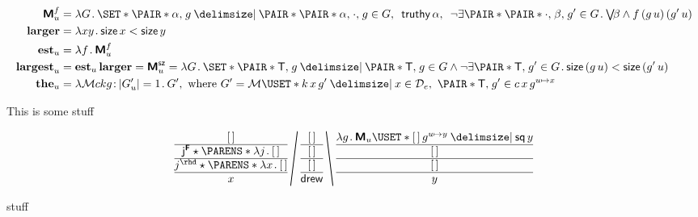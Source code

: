 \documentclass[10pt,fleqn]{article}
\newcommand{\M}{\text{\sffamily\bfseries M}}
\newcommand{\F}{\text{\sffamily\bfseries F}}
\begin{document}
\begin{minipage}[t]{0.6\textwidth}
\begin{spreadlines}{0em}
\begin{align*}
  \M_u^f &=
  \lambda G \dt
    \set{%
      \pair{\cn{\alpha}}{g}
    \giv
      \pair{\pair{\cn{\alpha}}{\cdot}}{g} \in G
      ,\ \, 
      \cn{truthy}\,\alpha
      ,\ \, 
      \neg\exists\pair{\pair{\cdot}{\beta}}{g'} \in G \dt
        \mathsmaller{\bigvee}\!\beta \land f\,(g\,u)\,(g'\,u)
    } \\
  \textbf{larger} &=
  \lambda xy \dt \cn{size}\,x < \cn{size}\,y \\
  \textbf{est}_u &=
  \lambda f \dt \M_u^f\\
  \textbf{largest}_u &=
  \textbf{est}_u\,\textbf{larger} =
  \M_u^\cn{sz} =
  \lambda G \dt
    \set{%
      \pair{\cn{T}}{g}
    \giv
      \pair{\cn{T}}{g} \in G
      \land
      \neg\exists\pair{\cn{T}}{g'} \in G \dt
        \cn{size}\,(g\,u) < \cn{size}\,(g'\,u)
    } \\
  \textbf{the}_u &=
  \lambda\mathcal{M}ckg \col |G'_u| = 1 \dt G',
  \ \textrm{where} \ 
  G' = \mathcal{M}\uset{%
    k\,x\,g'
  \giv
    x\in \mathcal{D}_e,\ \pair{\cn{T}}{g'} \in c\,x\,g^{u\mapsto x}
  }
\end{align*}
\end{spreadlines}
\end{minipage}
%
%
\begin{minipage}[t]{0.4\textwidth}
This is some stuff

\end{minipage}

\dotfill

\begin{minipage}[t]{0.6\textwidth}
\begin{align*}
  \bitttt{\hole}{%
    \cn{j}^\F \star \p{\l j \dt \hole}
  }{%
    j^\rhd \star \p{\l x \dt \hole}
  }{x}
%
\FSL{%
  \bitttt{\hole}{\hole}{\hole}{\cn{drew}}
}
%
\BSL{%
  \bitttt{%
    \lambda g \dt
      \M_u \uset{%
        \hole\,g^{u\mapsto y}
      \giv
        \cn{sq}\,y
      }
  }{\hole}{\hole}{y}
}
\end{align*}  
\end{minipage}
%
%
\begin{minipage}[t]{0.4\textwidth}
stuff
\end{minipage}
\end{document}
